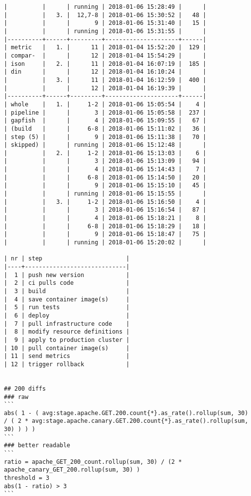 \begin{verbatim}
|          |      | running | 2018-01-06 15:28:49 |      |
|          |   3. |  12,7-8 | 2018-01-06 15:30:52 |   48 |
|          |      |       9 | 2018-01-06 15:31:40 |   15 |
|          |      | running | 2018-01-06 15:31:55 |      |
|----------+------+---------+---------------------+------|
| metric   |   1. |      11 | 2018-01-04 15:52:20 |  129 |
| compar-  |      |      12 | 2018-01-04 15:54:29 |      |
| ison     |   2. |      11 | 2018-01-04 16:07:19 |  185 |
| din      |      |      12 | 2018-01-04 16:10:24 |      |
|          |   3. |      11 | 2018-01-04 16:12:59 |  400 |
|          |      |      12 | 2018-01-04 16:19:39 |      |
|----------+------+---------+---------------------+------|
| whole    |   1. |     1-2 | 2018-01-06 15:05:54 |    4 |
| pipeline |      |       3 | 2018-01-06 15:05:58 |  237 |
| gapfish  |      |       4 | 2018-01-06 15:09:55 |   67 |
| (build   |      |     6-8 | 2018-01-06 15:11:02 |   36 |
| step (5) |      |       9 | 2018-01-06 15:11:38 |   70 |
| skipped) |      | running | 2018-01-06 15:12:48 |      |
|          |   2. |     1-2 | 2018-01-06 15:13:03 |    6 |
|          |      |       3 | 2018-01-06 15:13:09 |   94 |
|          |      |       4 | 2018-01-06 15:14:43 |    7 |
|          |      |     6-8 | 2018-01-06 15:14:50 |   20 |
|          |      |       9 | 2018-01-06 15:15:10 |   45 |
|          |      | running | 2018-01-06 15:15:55 |      |
|          |   3. |     1-2 | 2018-01-06 15:16:50 |    4 |
|          |      |       3 | 2018-01-06 15:16:54 |   87 |
|          |      |       4 | 2018-01-06 15:18:21 |    8 |
|          |      |     6-8 | 2018-01-06 15:18:29 |   18 |
|          |      |       9 | 2018-01-06 15:18:47 |   75 |
|          |      | running | 2018-01-06 15:20:02 |      |

| nr | step                        |
|----+-----------------------------|
|  1 | push new version            |
|  2 | ci pulls code               |
|  3 | build                       |
|  4 | save container image(s)     |
|  5 | run tests                   |
|  6 | deploy                      |
|  7 | pull infrastructure code    |
|  8 | modify resource definitions |
|  9 | apply to production cluster |
| 10 | pull container image(s)     |
| 11 | send metrics                |
| 12 | trigger rollback            |


## 200 diffs
### raw
```
abs( 1 - ( avg:stage.apache.GET.200.count{*}.as_rate().rollup(sum, 30) / ( 2 * avg:stage.apache.canary.GET.200.count{*}.as_rate().rollup(sum, 30) ) ) )
```
### better readable
```
ratio = apache_GET_200_count.rollup(sum, 30) / (2 * apache_canary_GET_200.rollup(sum, 30) )
threshold = 3
abs(1 - ratio) > 3
```
\end{verbatim}
